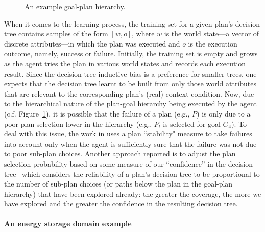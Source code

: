 \begin{figure}[t]
\begin{center}

\end{center}
\caption{An example goal-plan hierarchy.}
\label{fig:confidence}
\end{figure}

When it comes to the learning process, the training set for a given plan's decision tree contains samples of the form $[w, o]$, where $w$ is the world state---a vector of discrete attributes---in which the plan was executed and $o$ is the execution outcome, namely, success or failure. Initially, the training set is empty and grows as the agent tries the plan in various world states and records each execution result. 
Since the decision tree inductive bias is a preference for smaller trees, one expects that the decision tree learnt to be built from only those world attributes that are relevant to the corresponding plan's (real) context condition.
Now, due to the hierarchical nature of the plan-goal hierarchy being executed by the agent (c.f. Figure~\ref{fig:confidence}), it is possible that the failure of a plan (e.g., $P$) is only due to a poor plan selection lower in the hierarchy (e.g., $P_l$ is selected for goal $G_4$).
To deal with this issue, the work in \cite{airiau09:enhancing} uses a plan ``stability" measure to take failures into account only when the agent is sufficiently sure that the failure was not due to poor sub-plan choices. Another approach reported is to adjust the plan selection probability based on some measure of our ``confidence'' in the decision tree~\cite{singh10:learning} which considers the reliability of a plan's decision tree to be proportional to the number of sub-plan choices (or paths below the plan in the goal-plan hierarchy) that have been explored already: the greater the coverage, the more we have explored and the greater the confidence in the resulting decision tree. 

\paragraph{An energy storage domain example}




